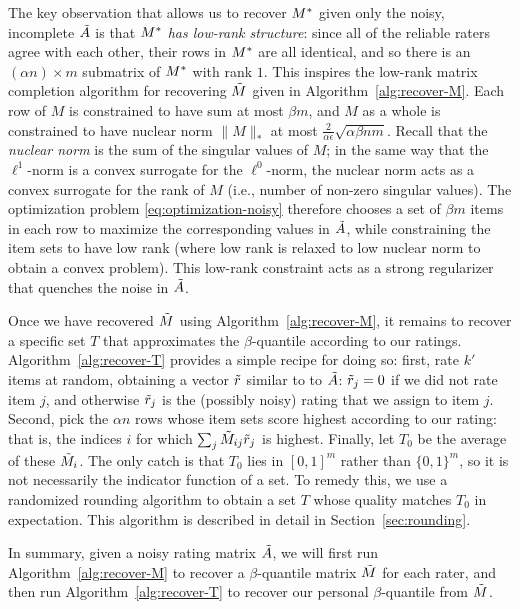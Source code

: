 The key observation that allows us to recover $M^*$ given only the noisy, 
incomplete $\tilde{A}$ is that \emph{$M^*$ has low-rank structure}: since all 
of the reliable raters agree with each other, their rows in $M^*$ are all 
identical, and so there is an $(\alpha n) \times m$ submatrix of $M^*$ with 
rank $1$. This inspires the low-rank matrix completion algorithm for recovering 
$\tilde{M}$ given in Algorithm~\ref{alg:recover-M}. Each row of $M$ is constrained 
to have sum at most $\beta m$, and $M$ as a whole is constrained to have 
nuclear norm $\|M\|_*$ at most $\frac{2}{\alpha \epsilon}\sqrt{\alpha\beta nm}$. 
Recall that the \emph{nuclear norm} is the sum of the singular values of 
$M$; in the same way that the $\ell^1$-norm is a convex surrogate for the 
$\ell^0$-norm, the nuclear norm acts as a convex surrogate for the rank of $M$ 
(i.e., number of non-zero singular values). The optimization problem 
\eqref{eq:optimization-noisy} therefore chooses a set of $\beta m$ items in each 
row to maximize the corresponding values in $\tilde{A}$, while constraining the item 
sets to have low rank (where low rank is relaxed to low nuclear norm to obtain 
a convex problem). 
This low-rank constraint acts as a strong regularizer that quenches the noise 
in $\tilde{A}$.



Once we have recovered $\tilde{M}$ using Algorithm~\ref{alg:recover-M}, it remains to 
recover a specific set $T$ that approximates the $\beta$-quantile according to 
our ratings. Algorithm~\ref{alg:recover-T} provides a simple recipe for doing so: 
first, rate $k'$ items at random, obtaining a vector $\tilde{r}$ similar to to 
$\tilde{A}$: $\tilde{r}_j = 0$ if we did not rate item $j$, and otherwise $\tilde{r}_j$ is 
the (possibly noisy) rating that we assign to item $j$. Second, pick the 
$\alpha n$ rows whose item sets score highest according to our rating: that is, 
the indices $i$ for which $\sum_j \tilde{M}_{ij}\tilde{r}_j$ is highest. Finally, let 
$T_0$ be the average of these $\tilde{M}_i$. The only catch is that $T_0$ lies in 
$[0,1]^m$ rather than $\{0,1\}^m$, so it is not necessarily the indicator 
function of a set. To remedy this, we use a randomized rounding algorithm to 
obtain a set $T$ whose quality matches $T_0$ in expectation. This algorithm 
is described in detail in Section~\ref{sec:rounding}.

In summary, given a noisy rating matrix $\tilde{A}$, we will first run 
Algorithm~\ref{alg:recover-M} to recover a $\beta$-quantile matrix $\tilde{M}$ for 
each rater, and then run Algorithm~\ref{alg:recover-T} to recover our 
personal $\beta$-quantile from $\tilde{M}$.

